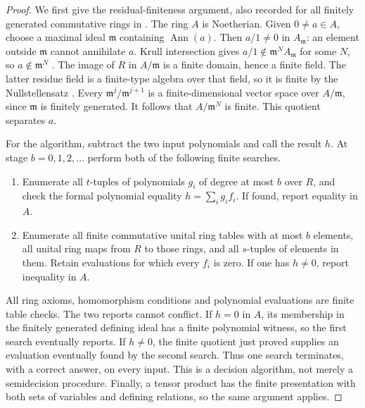 \begin{proof}
We first give the residual-finiteness argument, also recorded for all
finitely generated commutative rings in
\cite[\S2.1, before Lemma 2.1]{C-JaikinZapirain2023}.
The ring $A$ is Noetherian. Given $0\ne a\in A$, choose a maximal ideal
$\mathfrak m$ containing $\operatorname{Ann}(a)$. Then $a/1\ne0$ in
$A_{\mathfrak m}$: an element outside $\mathfrak m$ cannot annihilate
$a$. Krull intersection gives $a/1\notin\mathfrak m^N A_{\mathfrak m}$
for some $N$, so $a\notin\mathfrak m^N$
\cite[Tag 00IP, Lemma 10.51.4]{C-StacksFiniteBaseEquality}.
The image of $R$ in $A/\mathfrak m$ is a finite domain, hence a finite
field. The latter residue field is a finite-type algebra over that
field, so it is finite by the Nullstellensatz
\cite[Tag 00FV, Theorem 10.34.1(1)]{C-StacksFiniteBaseEquality}.
Every $\mathfrak m^j/\mathfrak m^{j+1}$ is a finite-dimensional vector
space over $A/\mathfrak m$, since $\mathfrak m$ is finitely generated.
It follows that $A/\mathfrak m^N$ is finite. This quotient separates $a$.

For the algorithm, subtract the two input polynomials and call the
result $h$. At stage $b=0,1,2,\ldots$ perform both of the following
finite searches.
\begin{enumerate}
\item Enumerate all $t$-tuples of polynomials $g_i$ of degree at most
$b$ over $R$, and check the formal polynomial equality
$h=\sum_i g_i f_i$. If found, report equality in $A$.
\item Enumerate all finite commutative unital ring tables with at most
$b$ elements, all unital ring maps from $R$ to those rings, and all
$s$-tuples of elements in them. Retain evaluations for which every
$f_i$ is zero. If one has $h\ne0$, report inequality in $A$.
\end{enumerate}
All ring axioms, homomorphism conditions and polynomial evaluations
are finite table checks. The two reports cannot conflict. If $h=0$
in $A$, its membership in the finitely generated defining ideal has
a finite polynomial witness, so the first search eventually reports.
If $h\ne0$, the finite quotient just proved supplies an evaluation
eventually found by the second search. Thus one search terminates,
with a correct answer, on every input. This is a decision algorithm,
not merely a semidecision procedure. Finally, a tensor product has the
finite presentation with both sets of variables and defining
relations, so the same argument applies.
\end{proof}

